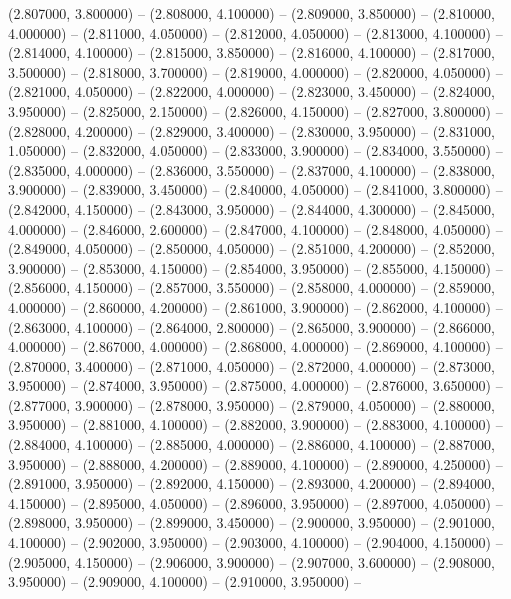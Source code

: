 (2.807000, 3.800000) -- 
(2.808000, 4.100000) -- 
(2.809000, 3.850000) -- 
(2.810000, 4.000000) -- 
(2.811000, 4.050000) -- 
(2.812000, 4.050000) -- 
(2.813000, 4.100000) -- 
(2.814000, 4.100000) -- 
(2.815000, 3.850000) -- 
(2.816000, 4.100000) -- 
(2.817000, 3.500000) -- 
(2.818000, 3.700000) -- 
(2.819000, 4.000000) -- 
(2.820000, 4.050000) -- 
(2.821000, 4.050000) -- 
(2.822000, 4.000000) -- 
(2.823000, 3.450000) -- 
(2.824000, 3.950000) -- 
(2.825000, 2.150000) -- 
(2.826000, 4.150000) -- 
(2.827000, 3.800000) -- 
(2.828000, 4.200000) -- 
(2.829000, 3.400000) -- 
(2.830000, 3.950000) -- 
(2.831000, 1.050000) -- 
(2.832000, 4.050000) -- 
(2.833000, 3.900000) -- 
(2.834000, 3.550000) -- 
(2.835000, 4.000000) -- 
(2.836000, 3.550000) -- 
(2.837000, 4.100000) -- 
(2.838000, 3.900000) -- 
(2.839000, 3.450000) -- 
(2.840000, 4.050000) -- 
(2.841000, 3.800000) -- 
(2.842000, 4.150000) -- 
(2.843000, 3.950000) -- 
(2.844000, 4.300000) -- 
(2.845000, 4.000000) -- 
(2.846000, 2.600000) -- 
(2.847000, 4.100000) -- 
(2.848000, 4.050000) -- 
(2.849000, 4.050000) -- 
(2.850000, 4.050000) -- 
(2.851000, 4.200000) -- 
(2.852000, 3.900000) -- 
(2.853000, 4.150000) -- 
(2.854000, 3.950000) -- 
(2.855000, 4.150000) -- 
(2.856000, 4.150000) -- 
(2.857000, 3.550000) -- 
(2.858000, 4.000000) -- 
(2.859000, 4.000000) -- 
(2.860000, 4.200000) -- 
(2.861000, 3.900000) -- 
(2.862000, 4.100000) -- 
(2.863000, 4.100000) -- 
(2.864000, 2.800000) -- 
(2.865000, 3.900000) -- 
(2.866000, 4.000000) -- 
(2.867000, 4.000000) -- 
(2.868000, 4.000000) -- 
(2.869000, 4.100000) -- 
(2.870000, 3.400000) -- 
(2.871000, 4.050000) -- 
(2.872000, 4.000000) -- 
(2.873000, 3.950000) -- 
(2.874000, 3.950000) -- 
(2.875000, 4.000000) -- 
(2.876000, 3.650000) -- 
(2.877000, 3.900000) -- 
(2.878000, 3.950000) -- 
(2.879000, 4.050000) -- 
(2.880000, 3.950000) -- 
(2.881000, 4.100000) -- 
(2.882000, 3.900000) -- 
(2.883000, 4.100000) -- 
(2.884000, 4.100000) -- 
(2.885000, 4.000000) -- 
(2.886000, 4.100000) -- 
(2.887000, 3.950000) -- 
(2.888000, 4.200000) -- 
(2.889000, 4.100000) -- 
(2.890000, 4.250000) -- 
(2.891000, 3.950000) -- 
(2.892000, 4.150000) -- 
(2.893000, 4.200000) -- 
(2.894000, 4.150000) -- 
(2.895000, 4.050000) -- 
(2.896000, 3.950000) -- 
(2.897000, 4.050000) -- 
(2.898000, 3.950000) -- 
(2.899000, 3.450000) -- 
(2.900000, 3.950000) -- 
(2.901000, 4.100000) -- 
(2.902000, 3.950000) -- 
(2.903000, 4.100000) -- 
(2.904000, 4.150000) -- 
(2.905000, 4.150000) -- 
(2.906000, 3.900000) -- 
(2.907000, 3.600000) -- 
(2.908000, 3.950000) -- 
(2.909000, 4.100000) -- 
(2.910000, 3.950000) -- 
